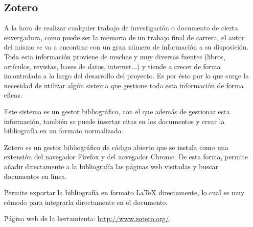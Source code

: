 \subsection{Zotero}
A la hora de realizar cualquier trabajo de investigación o documento de cierta envergadura, como puede ser la memoria de un trabajo final de carrera, el autor del mismo se va a encontrar con un gran número de información a su disposición. Toda esta información proviene de muchas y muy diversas fuentes (libros, artículos, revistas, bases de datos, internet...) y tiende a crecer de forma incontrolada a lo largo del desarrollo del proyecto. Es por ésto por lo que surge la necesidad de utilizar algún sistema que gestione toda esta información de forma eficaz.

Este sistema es un gestor bibliográfico, con el que además de gestionar esta información, también se puede insertar citas en los documentos y crear la bibliografía en un formato normalizado.

Zotero es un gestor bibliográfico de código abierto que se instala como una extensión del navegador Firefox y del navegador Chrome. De esta forma, permite añadir directamente a la bibliografía las páginas web visitadas y buscar documentos en línea.

Permite exportar la bibliografía en formato \LaTeX{} directamente, lo cual es muy cómodo para integrarla directamente en el documento.

Página web de la herramienta: \url{http://www.zotero.org/}.


